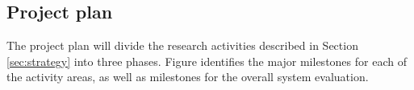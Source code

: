 \subsection{Project plan}

The project plan will divide the research activities described in Section
\ref{sec:strategy} into three phases. Figure \cite{fig:plan} identifies the major
milestones for each of the activity areas, as well as milestones for the overall
system evaluation.










